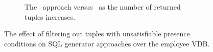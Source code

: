 \begin{figure}[t!]
\begin{subfigure}[t]{0.5\textwidth}
        \caption[The \nbf\ approach versus \nbff\ as the number of returned tuples increases]{The \nbf\ approach versus \nbff\ as the number of returned tuples increases.}
        \label{fig:emp-nbf-tuple}
    \end{subfigure}    
    \caption[The effect of filtering out tuples with unsatisfiable presence conditions on SQL generator 
    approaches over the employee VDB]{The effect of filtering out tuples with unsatisfiable presence conditions on SQL generator 
    approaches over the employee VDB.}
    \label{fig:emp-nbfs-filter}
\end{figure}


